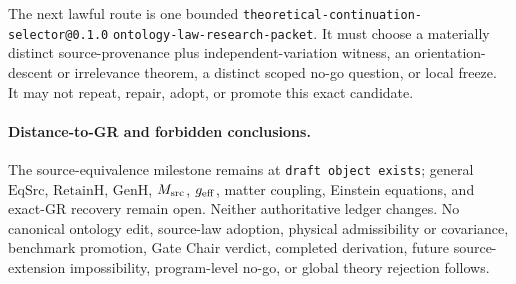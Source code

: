 The next lawful route is one bounded
\texttt{theoretical-continuation-selector@0.1.0}
\texttt{ontology-law-research-packet}.  It must choose a materially distinct
source-provenance plus independent-variation witness, an orientation-descent
or irrelevance theorem, a distinct scoped no-go question, or local freeze.
It may not repeat, repair, adopt, or promote this exact candidate.

\paragraph{Distance-to-GR and forbidden conclusions.}
The source-equivalence milestone remains at \texttt{draft object exists};
general \(\mathrm{EqSrc}\), \(\mathrm{RetainH}\), \(\mathrm{GenH}\),
\(M_{\rm src}\), \(g_{\rm eff}\), matter coupling, Einstein equations, and
exact-GR recovery remain open.  Neither authoritative ledger changes.
No canonical ontology edit, source-law adoption, physical admissibility or
covariance, benchmark promotion, Gate Chair verdict, completed derivation,
future source-extension impossibility, program-level no-go, or global theory
rejection follows.
